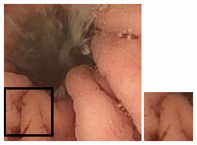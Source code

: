 \documentclass[conference]{IEEEtran}
\begin{document}
\begin{figure}[!t]
    \endminipage\hfill

        \centering
        \includegraphics[width=\linewidth]{Figures/906/906_border.png}
        
    \endminipage\hfill
        \centering
        \includegraphics[width=\linewidth]{Figures/906/906_Bicubical.jpg}
        

\end{figure}
\end{document}
